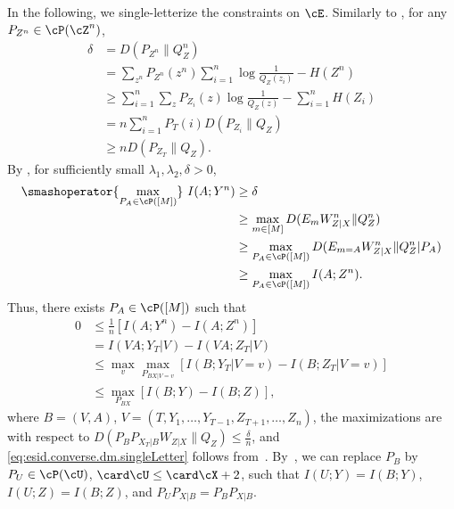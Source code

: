\documentclass[conference,final]{IEEEtran}
\begin{document}
In the following, we single-letterize the constraints
on $\cE$.
Similarly to \cite[Eq. (1.49)]{HouKramerBloch2017EffectiveSecrecyReliability},
for any $P_{Z^n} \in \cP(\cZ^n)$,
\begin{align}
  \delta & = D(P_{Z^n} \| Q_Z^{n})
  \\& = \sum_{z^n} P_{Z^n}(z^n) \sum_{i=1}^n \log \frac{1}{Q_Z(z_i)} - H(Z^n)
    \label{eq:esid.converse.dm.expandStealth}
  \\& \ge \sum_{i=1}^n \sum_z P_{Z_i}(z) \log \frac{1}{Q_Z(z)} - \sum_{i=1}^n H(Z_i)
  \\& = n \sum_{i=1}^n P_T(i) D(P_{Z_i} \| Q_Z)
  \\& \ge n D(P_{Z_T} \| Q_Z).
    \label{eq:esid.converse.dm.stealthSingleLetter}
\end{align}
By \cite[Lemma~90]{Ahlswede2021IdenticationOtherProbabilistic},
for sufficiently small $\lambda_1, \lambda_2, \delta > 0$,
\begin{align}
  \smashoperator{\max_{P_A \in \cP([M])}} ~ I(A; Y^n)
    & \ge \delta
  \\& \ge \max_{m \in [M]} D(E_m W_{Z|X}^n \| Q_Z^n)
  \\& \ge \max_{P_A \in \cP([M])} D(E_{m=A} W_{Z|X}^n \| Q_Z^n | P_A)
  \\& \ge \max_{P_A \in \cP([M])} I(A; Z^n).
\end{align}
Thus, there exists $P_A \in \cP([M])$ such that
\begin{align}
  0 & \le \frac{1}{n} [ I(A; Y^n) - I(A; Z^n) ]
    \label{eq:esid.converse.dm.substractMutInf}
  \\& = I(V A; Y_T|V) - I(V A; Z_T|V)
    \label{eq:esid.converse.dm.singleLetter}
  \\& \le \max_v \max_{P_{BX|V=v}} [ I(B; Y_T|V=v) - I(B; Z_T|V=v) ]
    \label{eq:esid.converse.dm.diff.maxV}
  \\& \le \max_{P_{BX}}  [ I(B; Y) - I(B; Z) ],
    \label{eq:esid.converse.dm.rateBound}
\end{align}
where
$B = (V,A)$,
$V = (T, Y_1,\dots,Y_{T-1}, Z_{T+1},\dots,Z_n)$,
the maximizations are with respect to 
$D(P_B P_{X_T|B} W_{Z|X}\| Q_Z) \le \frac{\delta}{n}$,
and \cref{eq:esid.converse.dm.singleLetter} follows
from~\cite[Lemma 17.12]{CsiszarKoerner2011InformationTheoryCoding}.
By~\cite[Lemmas~15.4 and~15.5]{CsiszarKoerner2011InformationTheoryCoding},
we can replace $P_B$ by $P_U \in \cP(\cU)$, $\card\cU \le \card\cX + 2$,
such that
$I(U; Y) = I(B; Y)$,
$I(U; Z) = I(B; Z)$,
and $P_U P_{X|B} = P_B P_{X|B}$.
\end{document}

